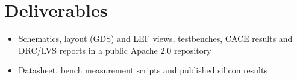 \documentclass[10pt,a4paper]{article}
\begin{document}
\section{Deliverables}
\begin{itemize}
    \item Schematics, layout (GDS) and LEF views, testbenches, CACE results and DRC/LVS reports in a public Apache 2.0 repository
    \item Datasheet, bench measurement scripts and published silicon results
\end{itemize}

\end{document}
